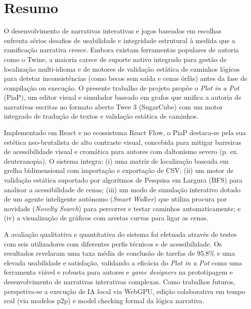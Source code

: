 \thispagestyle{plain}
\chapter*{Resumo}

O desenvolvimento de narrativas interativas e jogos baseados em escolhas enfrenta sérios desafios de usabilidade e integridade estrutural à medida que a ramificação narrativa cresce. Embora existam ferramentas populares de autoria como o Twine, a maioria carece de suporte nativo integrado para gestão de localização multi-idioma e de motores de validação estática de caminhos lógicos para detetar inconsistências (como becos sem saída e cenas órfãs) antes da fase de compilação ou execução. O presente trabalho de projeto propõe o \textit{Plot in a Pot} (PiaP), um editor visual e simulador baseado em grafos que unifica a autoria de narrativas escritas no formato aberto Twee 3 (SugarCube) com um motor integrado de tradução de textos e validação estática de caminhos.

Implementado em React e no ecossistema React Flow, o PiaP destaca-se pela sua estética neo-brutalista de alto contraste visual, concebida para mitigar barreiras de acessibilidade visual e cromática para autores com daltonismo severo (p. ex. deuteranopia). O sistema integra: (i) uma matriz de localização baseada em grelha bidimensional com importação e exportação de CSV; (ii) um motor de validação estática suportado por algoritmos de Pesquisa em Largura (BFS) para analisar a acessibilidade de cenas; (iii) um modo de simulação interativo dotado de um agente inteligente autónomo (\textit{Smart Walker}) que utiliza procura por novidade (\textit{Novelty Search}) para percorrer e testar caminhos automaticamente; e (iv) a visualização de gráficos com arestas curvas para ligar as cenas.

A avaliação qualitativa e quantitativa do sistema foi efetuada através de testes com seis utilizadores com diferentes perfis técnicos e de acessibilidade. Os resultados revelaram uma taxa média de conclusão de tarefas de 95,8\% e uma elevada usabilidade e satisfação, validando a eficácia do \textit{Plot in a Pot} como uma ferramenta viável e robusta para autores e \textit{game designers} na prototipagem e desenvolvimento de narrativas interativas complexas. Como trabalhos futuros, perspetiva-se a execução de IA local via WebGPU, edição colaborativa em tempo real (via modelos \gls{p2p}) e model checking formal da lógica narrativa.


